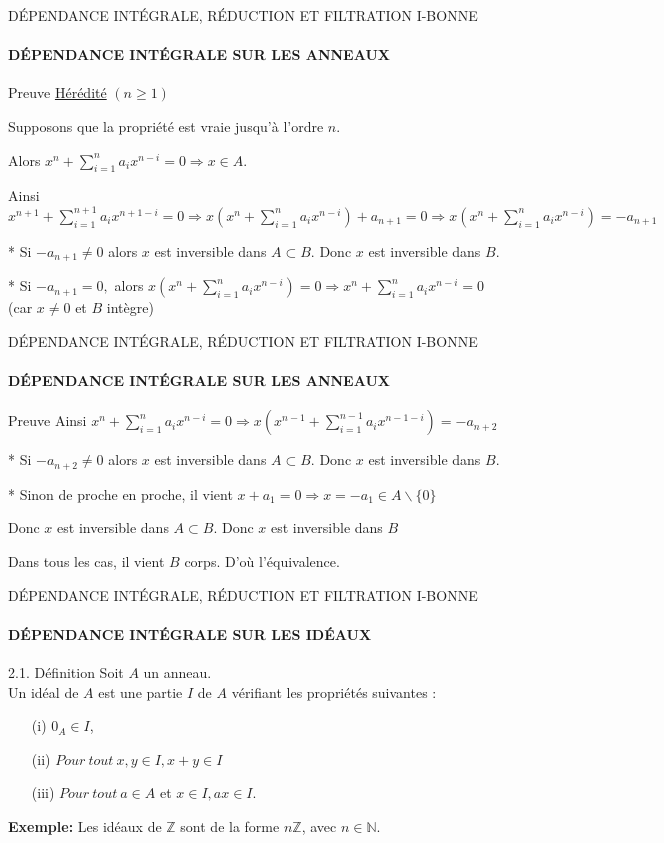 \documentclass[11pt,a4paper]{beamer}
\begin{document}
\begin{frame}{DÉPENDANCE INTÉGRALE, RÉDUCTION ET FILTRATION I-BONNE}
	\framesubtitle{DÉPENDANCE INTÉGRALE SUR LES ANNEAUX}
	\begin{block}{Preuve}
		\underline{Hérédité} $(n\geq 1)$
		
		Supposons que la propriété est vraie jusqu'à l'ordre $n.$
		
		Alors $x^{n}+\sum\limits_{i=1}^{n}a_{i}x^{n-i}=0\Rightarrow x\in A.$
		
		Ainsi $x^{n+1}+\sum\limits_{i=1}^{n+1}a_{i}x^{n+1-i}=0\Rightarrow 
		x(x^{n}+\sum\limits_{i=1}^{n}a_{i}x^{n-i})+a_{n+1}=0\Rightarrow x(x^{n}+\sum\limits_{i=1}^{n}a_{i}x^{n-i})=-a_{n+1}$
		
		* Si $-a_{n+1}\neq 0$ alors $x$ est inversible dans $A\subset B.$ Donc $x$
		est inversible dans $B.$
		
		* Si $-a_{n+1}=0,$ alors $x(x^{n}+\sum\limits_{i=1}^{n}a_{i}x^{n-i})=0\Rightarrow x^{n}+\sum\limits_{i=1}^{n}a_{i}x^{n-i}=0$ (car $x\neq 0$ et $B$ intègre)
	\end{block}
\end{frame}

\begin{frame}{DÉPENDANCE INTÉGRALE, RÉDUCTION ET FILTRATION I-BONNE}
	\framesubtitle{DÉPENDANCE INTÉGRALE SUR LES ANNEAUX}
	\begin{block}{Preuve}
			Ainsi $x^{n}+\sum\limits_{i=1}^{n}a_{i}x^{n-i}=0\Rightarrow
		x(x^{n-1}+\sum\limits_{i=1}^{n-1}a_{i}x^{n-1-i})=-a_{n+2}$
		
		* Si $-a_{n+2}\neq 0$ alors $x$ est inversible dans $A\subset B.$ Donc $x$
		est inversible dans $B.$
		
		* Sinon de proche en proche, il vient $x+a_{1}=0\Rightarrow x=-a_{1}\in
		A\backslash \{0\}$
		
		Donc $x$ est inversible dans $A\subset B.$ Donc $x$ est inversible dans $B$
		
		Dans tous les cas, il vient $B$ corps. D'où l'équivalence.
	\end{block}
\end{frame}


\begin{frame}{DÉPENDANCE INTÉGRALE, RÉDUCTION ET FILTRATION I-BONNE}
	\framesubtitle{DÉPENDANCE INTÉGRALE SUR LES IDÉAUX}
	\begin{block}{2.1. Définition}
		Soit $A$ un anneau.\\
		Un idéal de $A$ est une partie $I$ de $A$ vérifiant les propriétés suivantes : \\
		\begin{enumerate}
			\item[(i)] $0_A \in I$, \pause
			\item[(ii)]$ Pour \ tout \ x, y \in I, x+y \in I$ \pause
			\item[(iii)]$ Pour \ tout \ a \in A$ et $x \in I , ax \in I$.
		\end{enumerate}
		\textbf{Exemple:} Les idéaux de $\mathbb{Z}$ sont de la forme $n\mathbb{Z}$, avec $n \in \mathbb{N}$. \pause
	\end{block}
\end{frame}
\end{document}
